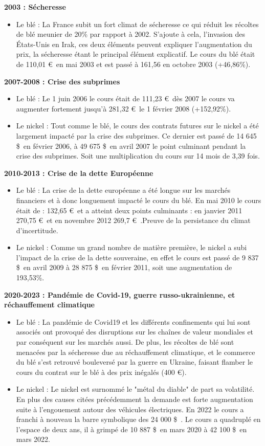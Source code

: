 \textbf{2003 : Sécheresse}
    \begin{itemize}
    \item Le blé : La France subit un fort climat de sécheresse ce qui réduit les récoltes de blé meunier de 20\% par rapport à 2002. S'ajoute à cela, l'invasion des 
    États-Unis en Irak, ces deux éléments peuvent expliquer l'augmentation du prix, la sécheresse étant le principal élément explicatif. Le cours du blé était de 110,01 
    \euro\ en mai 
    2003 et est passé à 161,56  en octobre 2003 (+46,86\%).
    \end{itemize}
\textbf{2007-2008 : Crise des subprimes}
\begin{itemize}
    \item Le blé : Le 1 juin 2006 le cours était de 111,23 \euro\, dès 2007 le cours va augmenter fortement jusqu'à 281,32 \euro\ le 1 février 2008 (+152,92\%).
     \item Le nickel :  Tout comme le blé, le cours des contrats futures sur le nickel a été largement impacté par la crise des subprimes. Ce dernier est passé de 14 
     645 \$\ en février 2006, à 49 675 \$\ en avril 2007 le point culminant pendant la crise des subprimes. Soit une multiplication du cours sur 14 mois de 3,39 fois.
\end{itemize}
     \textbf{2010-2013 : Crise de la dette Européenne}
\begin{itemize}
    \item Le blé : La crise de la dette européenne a été longue sur les marchés financiers et à donc longuement impacté le cours du blé.
    En mai 2010 le cours était de : 132,65 \euro\ et a atteint deux points culminants : en janvier 2011 270,75 \euro\ et en novembre 2012 269,7 \euro\ .Preuve 
    de la persistance du climat d'incertitude.
    \item Le nickel : Comme un grand nombre de matière première, le nickel a subi l'impact de la crise de la dette souveraine, en effet le cours est passé de 9 837 
    \$\ en avril 2009 à 28 875 \$\ en février 2011, soit une augmentation de 193,53\%.
\end{itemize}
    \textbf{2020-2023 : Pandémie de Covid-19, guerre russo-ukrainienne, et réchauffement climatique}
\begin{itemize}    
    \item Le blé : La pandémie de Covid19 et les différents confinements qui lui sont associés ont provoqué des disruptions sur les chaînes de valeur mondiales et 
    par 
    conséquent sur les marchés aussi. De plus, les récoltes de blé sont menacées par la sécheresse due au réchauffement climatique, et le commerce du blé s'est 
    retrouvé bouleversé par la guerre en Ukraine, faisant flamber le cours du contrat sur le blé à des prix inégalés (400 \euro).
    \item Le nickel : Le nickel est surnommé le "métal du diable" de part sa volatilité. En plus des causes citées précédemment la demande est forte augmentation 
    suite à l'engouement autour des véhicules électriques. En 2022 le cours a franchi à nouveau la barre symbolique des 24 000 \$\ . Le cours a quadruplé en l'espace de 
    deux ans, il à grimpé de 10 887 \$\ en mars 2020 à 42 100 \$\ en mars 2022.
\end{itemize}
